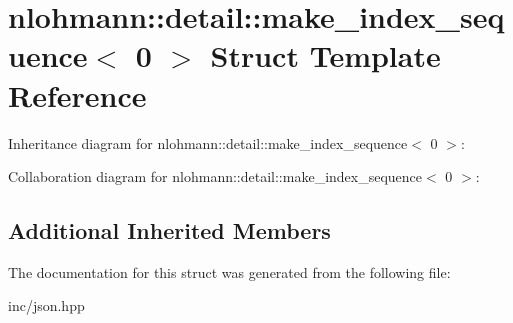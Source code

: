 \hypertarget{structnlohmann_1_1detail_1_1make__index__sequence_3_010_01_4}{}\section{nlohmann\+:\+:detail\+:\+:make\+\_\+index\+\_\+sequence$<$ 0 $>$ Struct Template Reference}
\label{structnlohmann_1_1detail_1_1make__index__sequence_3_010_01_4}


Inheritance diagram for nlohmann\+:\+:detail\+:\+:make\+\_\+index\+\_\+sequence$<$ 0 $>$\+:


Collaboration diagram for nlohmann\+:\+:detail\+:\+:make\+\_\+index\+\_\+sequence$<$ 0 $>$\+:
\subsection*{Additional Inherited Members}


The documentation for this struct was generated from the following file\+:\begin{DoxyCompactItemize}
\item 
inc/json.\+hpp\end{DoxyCompactItemize}
